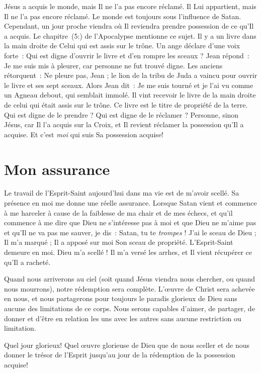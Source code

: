Jésus a acquis le monde, mais Il ne l'a pas encore réclamé.
 Il Lui appartient, mais Il ne l'a pas encore réclamé.
 Le monde est toujours sous l'influence de Satan.
 Cependant, un jour proche viendra où Il reviendra prendre possession
 de ce qu'Il a acquis.
 Le chapitre~(5:) de l'Apocalypse mentionne ce sujet.
 Il y a un livre dans la main droite de Celui qui est assis sur le trône.
 Un ange déclare d'une voix forte~:
 \og Qui est digne d'ouvrir le livre et d'en rompre les sceaux ? \fg{}
 Jean répond~: \og Je me suis mis à pleurer,
 car personne ne fut trouvé digne. \fg{}
 Les anciens rétorquent~: \og Ne pleure pas, Jean ;
 le lion de la tribu de Juda a vaincu pour ouvrir
 le livre et ses sept sceaux. \fg{}
 Alors Jean dit~: \og Je me suis tourné et je l'ai vu comme un Agneau debout,
 qui semblait immolé. Il vint recevoir le livre de la main droite
 de celui qui était assis sur le trône. \fg{}
 Ce livre est le titre de propriété de la terre.
 Qui est digne de le prendre ? Qui est digne de le réclamer ?
 Personne, sinon Jésus, car Il l'a acquis sur la Croix, et Il revient
 réclamer la possession qu'Il a acquise.
 Et c'est \emph{moi} qui suis Sa possession acquise!


\section{Mon assurance}

Le travail de l'Esprit-Saint aujourd'hui dans ma vie est de m'avoir scellé.
 Sa présence en moi me donne une réelle assurance.
 Lorsque Satan vient et commence à me harceler à cause de la faiblesse
 de ma chair et de mes échecs, et qu'il commence à me dire que Dieu
 ne s'intéresse pas à moi et que Dieu ne m'aime pas et qu'Il ne va pas
 me sauver, je dis~:
 \og Satan, tu te \emph{trompes} ! J'ai le sceau de Dieu ; Il m'a marqué ;
 Il a apposé sur moi Son sceau de propriété. L'Esprit-Saint demeure en moi.
 Dieu m'a scellé ! Il m'a versé les arrhes, et Il vient récupérer
 ce qu'Il a racheté. \fg{}

Quand nous arriverons au ciel (soit quand Jésus viendra nous chercher,
 ou quand nous mourrons), notre rédemption sera complète.
 L'œu\-vre de Christ sera achevée en nous, et nous partagerons pour
 toujours le paradis glorieux de Dieu sans aucune des limitations
 de ce corps. Nous serons capables d'aimer, de partager, de donner
 et d'être en relation les uns avec les autres sans aucune restriction
 ou limitation.

Quel jour glorieux! Quel œuvre glorieuse de Dieu que de nous sceller
 et de nous donner le trésor de l'Esprit jusqu'au jour de la rédemption
 de la possession acquise!


